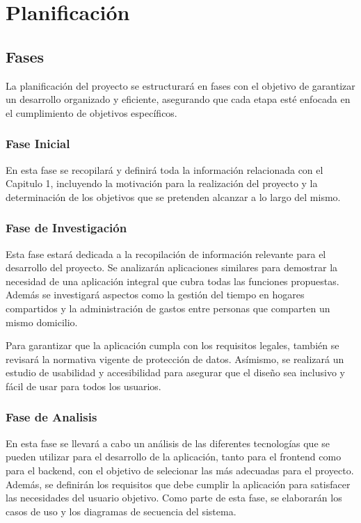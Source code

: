 \chapter{Planificación}
\label{cap:planificacion}

\section{Fases}
\label{sec:fases}
La planificación del proyecto se estructurará en fases con el objetivo de garantizar un desarrollo organizado y eficiente, asegurando que cada etapa esté enfocada en el cumplimiento de objetivos específicos.

\subsection{Fase Inicial}
En esta fase se recopilará y definirá toda la información relacionada con el Capitulo 1, incluyendo la motivación para la realización del proyecto y la determinación de los objetivos que se pretenden alcanzar a lo largo del mismo. 

\subsection{Fase de Investigación}
Esta fase estará dedicada a la recopilación de información relevante para el desarrollo del proyecto. Se analizarán aplicaciones similares para demostrar la necesidad de una aplicación integral que cubra todas las funciones propuestas. 
Además se investigará aspectos como la gestión del tiempo en hogares compartidos y la administración de gastos entre personas que comparten un mismo domicilio.

Para garantizar que la aplicación cumpla con los requisitos legales, también se revisará la normativa vigente de protección de datos. Asímismo, se realizará un estudio 
de usabilidad y accesibilidad para asegurar que el diseño sea inclusivo y fácil de usar para todos los usuarios.

\subsection{Fase de Analisis}
En esta fase se llevará a cabo un análisis de las diferentes tecnologías que se pueden utilizar para el desarrollo de la aplicación, tanto para el frontend como para el 
backend, con el objetivo de selecionar las más adecuadas para el proyecto. Además, se definirán los requisitos que debe cumplir la aplicación para satisfacer las necesidades del usuario objetivo. Como
parte de esta fase, se elaborarán los casos de uso y los diagramas de secuencia del sistema.

